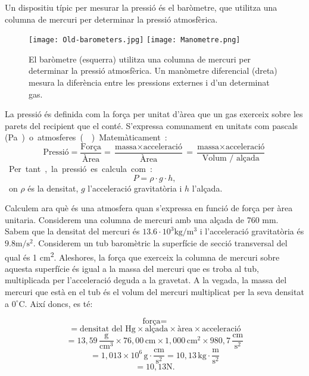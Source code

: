 Un dispositiu típic per mesurar la pressió és el baròmetre, que utilitza una columna de mercuri per determinar la pressió atmosfèrica. 

\begin{figure}[h]
    \centering
    \texttt{[image: Old-barometers.jpg]}
    \texttt{[image: Manometre.png]}
    \caption[Baròmetre i Manòmetre diferencial]{El baròmetre (esquerra) utilitza una columna de mercuri per determinar la pressió atmosfèrica. Un manòmetre diferencial (dreta) mesura la diferència entre les pressions externes i d'un determinat gas.}
    \label{fig:Manometre}
    \end{figure}

La pressió és definida com la força per unitat d'àrea que un gas exerceix sobre les parets del recipient que el conté. S'expressa comunament en unitats com pascals (\si\pascal) o atmosferes (\si\atm). Matemàticament:
\begin{equation}
\text{Pressió} = \frac{\text{Força}}{\text{Àrea}} = \frac{\text{massa} \times \text{acceleració}}{\text{Àrea}} = \frac{\text{massa} \times \text{acceleració}}{\text{Volum / alçada}} 
\end{equation}
Per tant, la pressió es calcula com:
\begin{equation}
P = \rho \cdot g \cdot h,
\end{equation}
on $\rho$ és la densitat, $g$ l'acceleració gravitatòria i $h$ l'alçada.

Calculem ara què és una atmosfera quan s'expressa en funció de força per àrea unitaria. Considerem una columna de mercuri amb una alçada de 760 mm. Sabem que la densitat del mercuri és $13.6 \cdot 10^3 \si{\kg\per\meter\tothe{3}}$ i l'acceleració gravitatòria és $9.8 \si{\meter\per\square\second}$.  Considerem un tub baromètric la superfície de secció transversal del qual és 1 \si{\square\cm}. Aleshores, la força que exerceix la columna de mercuri sobre aquesta superfície és igual a la massa del mercuri que es troba al tub, multiplicada per l'acceleració deguda a la gravetat. A la vegada, la massa del mercuri que està en el tub és el volum del mercuri multiplicat per la seva densitat a $0^{\circ}\text{C}$. Així doncs, es té:

\[
\text{força} = 
\]
\[
= \text{densitat del Hg} \times \text{alçada} \times \text{àrea} \times \text{acceleració}
\]
\[
= 13,59 \, \frac{\si\g}{\si{\cubic\cm}} \times 76,00 \, \si{\cm} \times 1,000 \, \si{\square\cm} \times 980,7 \, \frac{\si{\cm}}{\si{\s}^2}
\]
\[
= 1,013 \times 10^6 \, \si\g \cdot \frac{\si\cm}{\si{\s}^2} = 10,13 \, \si\kg \cdot \frac{\si\m}{\si{\s^2}}
\]
\[
= 10,13 \si{\newton}.
\]

